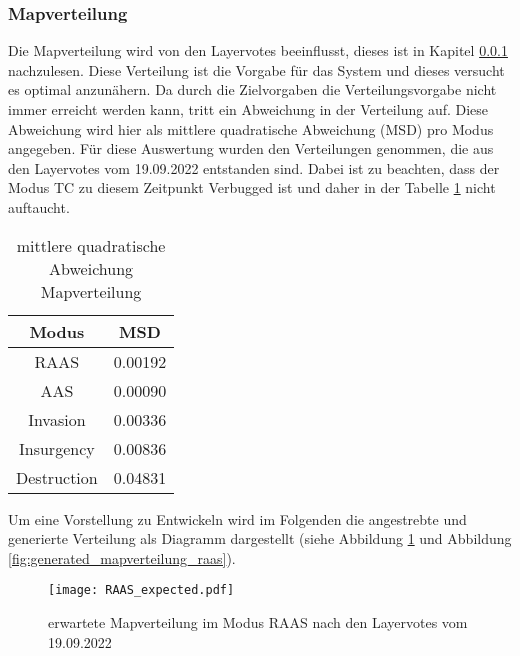         \subsubsection{Mapverteilung}
            Die Mapverteilung wird von den Layervotes beeinflusst, dieses ist in Kapitel \ref{}  nachzulesen.
            Diese Verteilung ist die Vorgabe für das System und dieses versucht es optimal anzunähern. Da durch die 
            Zielvorgaben die Verteilungsvorgabe nicht immer erreicht werden kann, tritt ein Abweichung in der Verteilung auf.
            Diese Abweichung wird hier als mittlere quadratische Abweichung (MSD)  pro Modus angegeben.
            Für diese Auswertung wurden den Verteilungen genommen, die aus den Layervotes vom 19.09.2022 entstanden sind.
            Dabei ist zu beachten, dass der Modus TC zu diesem Zeitpunkt \glqq{}Verbugged\grqq{} ist und daher 
            in der Tabelle \ref{t:Ergebnisse:fehler_Mapverteilung} nicht auftaucht.\\
            \begin{table}[h]
                \centering
                \begin{tabular}{|| c c ||}
                    \hline
                    Modus & MSD \\
                    \hline
                    \hline
                    RAAS & 0.00192 \\
                    \hline
                    AAS & 0.00090 \\
                    \hline
                    Invasion & 0.00336 \\
                    \hline
                    Insurgency & 0.00836 \\
                    \hline
                    Destruction & 0.04831 \\
                    \hline
                \end{tabular}
                \caption{mittlere quadratische Abweichung Mapverteilung}
                \label{t:Ergebnisse:fehler_Mapverteilung}
            \end{table}
            
            Um eine Vorstellung zu Entwickeln wird im Folgenden die angestrebte und generierte Verteilung als 
            Diagramm dargestellt (siehe Abbildung \ref{fig:expected_mapverteilung_raas} 
            und Abbildung \ref{fig:generated_mapverteilung_raas}).

            \begin{figure}[htbp]
                \centering
                \texttt{[image: RAAS\_expected.pdf]}
                \caption{erwartete Mapverteilung im Modus RAAS nach den Layervotes vom 19.09.2022}
                \label{fig:expected_mapverteilung_raas}
            \end{figure}

